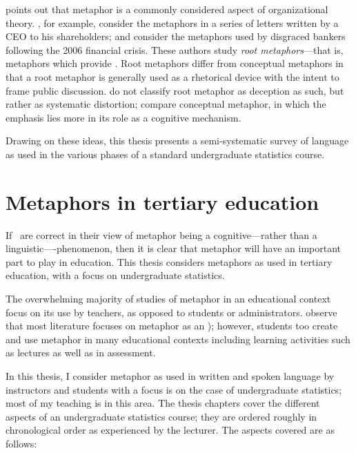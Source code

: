  points out that metaphor is a commonly
considered aspect of organizational theory.  , for
example, consider the metaphors in a series of letters written by a
CEO to his shareholders; and  consider the
metaphors used by disgraced bankers following the 2006 financial
crisis.  These authors study \emph{root metaphors}---that is,
metaphors which provide .  Root metaphors differ from
conceptual metaphors in that a root metaphor is generally used as a
rhetorical device with the intent to frame public discussion.
 do not classify root metaphor as deception as
such, but rather as systematic distortion; compare conceptual
metaphor, in which the emphasis lies more in its role as a cognitive
mechanism.

Drawing on these ideas, this thesis presents a semi-systematic survey
of language as used in the various phases of a standard undergraduate
statistics course.  

\section{Metaphors in tertiary education}


If~\citeauthor{lakoff1980} are correct in their view of metaphor being
a cognitive---rather than a linguistic----phenomenon, then it is clear
that metaphor will have an important part to play in education.  This
thesis considers metaphors as used in tertiary education, with a focus
on undergraduate statistics.

The overwhelming majority of studies of metaphor in an educational
context focus on its use by teachers, as opposed to students or
administrators.   observe that most literature
focuses on metaphor as an ); however, students too create and use metaphor in many
educational contexts including learning activities such as lectures as
well as in assessment.

In this thesis, I consider metaphor as used in written and spoken
language by instructors and students with a focus is on the case of
undergraduate statistics; most of my teaching is in this area.  The
thesis chapters cover the different aspects of an undergraduate
statistics course; they are ordered roughly in chronological order as
experienced by the lecturer.  The aspects covered are as follows:

